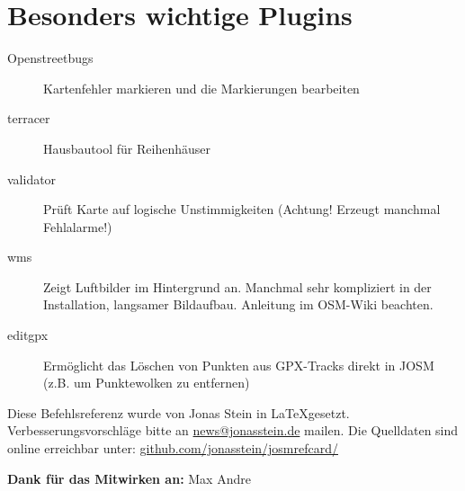 \documentclass[a4paper,11pt,notumble]{leaflet}
\begin{document}
\section*{Besonders wichtige Plugins}
\begin{description}
\item[Openstreetbugs] Kartenfehler markieren und die Markierungen bearbeiten
\item[terracer] Hausbautool für Reihenhäuser
\item[validator] Prüft Karte auf logische Unstimmigkeiten
(Achtung! Erzeugt manchmal Fehlalarme!) 
\item[wms] Zeigt Luftbilder im Hintergrund an. Manchmal sehr kompliziert in der Installation, langsamer Bildaufbau. 
Anleitung im OSM-Wiki beachten.
\item[editgpx] Ermöglicht das Löschen von Punkten aus GPX-Tracks direkt in JOSM (z.B. um Punktewolken zu entfernen)
\end{description}

\newpage
Diese Befehlsreferenz wurde von Jonas Stein in \LaTeX gesetzt.
Verbesserungsvorschläge bitte an \href{mailto:news@jonasstein.de}{news@jonasstein.de} mailen.
Die Quelldaten sind online erreichbar unter: 
\href{http://github.com/jonasstein/josmrefcard/}{github.com/jonasstein/josmrefcard/}

\textbf{Dank für das Mitwirken an:} Max Andre
\end{document}
